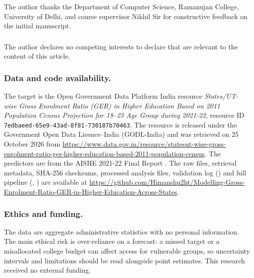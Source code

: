 \begin{credits}

\subsubsection{\ackname}
The author thanks the Department of Computer Science, Ramanujan College, University of Delhi, and course supervisor Nikhil Sir for constructive feedback on the initial manuscript.

\subsubsection{\discintname}
The author declares no competing interests to declare that are relevant to the content of this article.

\subsubsection{Data and code availability.}
The target is the Open Government Data Platform India resource \emph{States/UT-wise Gross Enrolment Ratio (GER) in Higher Education Based on 2011 Population Census Projection for 18--23 Age Group during 2021-22}, resource ID \texttt{7edbaeed-65e9-43ad-8f81-730187b70463}. The resource is released under the Government Open Data Licence--India (GODL-India) and was retrieved on 25 October 2026 from \url{https://www.data.gov.in/resource/statesut-wise-gross-enrolment-ratio-ger-higher-education-based-2011-population-census}. The predictors are from the AISHE 2021-22 Final Report \cite{aishe2023}. The raw files, retrieval metadata, SHA-256 checksums, processed analysis files, validation log () and full pipeline (, ) are available at \url{https://github.com/Himanshu2ht/Modelling-Gross-Enrolment-Ratio-GER-in-Higher-Education-Across-States}.

\subsubsection{Ethics and funding.}
The data are aggregate administrative statistics with no personal information. The main ethical risk is over-reliance on a forecast: a missed target or a misallocated college budget can affect access for vulnerable groups, so uncertainty intervals and limitations should be read alongside point estimates. This research received no external funding.


\end{credits}
